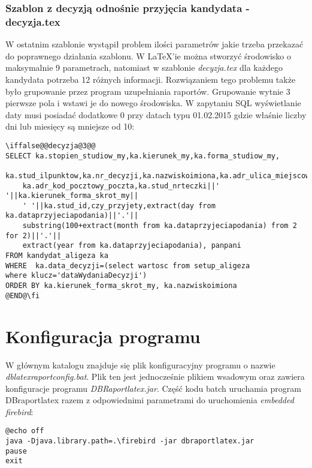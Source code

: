 \subsubsection*{Szablon z decyzją odnośnie przyjęcia kandydata - decyzja.tex}
W ostatnim szablonie wystąpił problem ilości parametrów jakie trzeba przekazać do poprawnego działania szablonu. W LaTeX'ie można stworzyć środowisko o maksymalnie 9 parametrach, natomiast w szablonie \emph{decyzja.tex} dla każdego kandydata potrzeba 12 różnych informacji. Rozwiązaniem tego problemu także było grupowanie przez program uzupełniania raportów. Grupowanie wytnie 3 pierwsze pola i wstawi je do nowego środowiska. W zapytaniu SQL wyświetlanie daty musi posiadać dodatkowe 0 przy datach typu 01.02.2015 gdzie właśnie liczby dni lub miesięcy są mniejsze od 10:
 \begin{lstlisting}
\iffalse@@decyzja@3@@
SELECT ka.stopien_studiow_my,ka.kierunek_my,ka.forma_studiow_my,
	ka.stud_ilpunktow,ka.nr_decyzji,ka.nazwiskoimiona,ka.adr_ulica_miejscowosc_nr_domu,
	ka.adr_kod_pocztowy_poczta,ka.stud_nrteczki||' '||ka.kierunek_forma_skrot_my||
	' '||ka.stud_id,czy_przyjety,extract(day from ka.dataprzyjeciapodania)||'.'||
	substring(100+extract(month from ka.dataprzyjeciapodania) from 2 for 2)||'.'||
	extract(year from ka.dataprzyjeciapodania), panpani
FROM kandydat_aligeza ka 
WHERE  ka.data_decyzji=(select wartosc from setup_aligeza 
where klucz='dataWydaniaDecyzji')
ORDER BY ka.kierunek_forma_skrot_my, ka.nazwiskoimiona
@END@\fi
\end{lstlisting}

\section{Konfiguracja programu}

W głównym katalogu znajduje się plik konfiguracyjny programu o nazwie  \emph{dblatexraportconfig.bat}. Plik ten jest jednocześnie plikiem wsadowym oraz zawiera konfiguracje programu \emph{DBRaportlatex.jar}. Część kodu batch uruchamia program DBraportlatex razem z odpowiednimi parametrami do uruchomienia \emph{embedded firebird}:
 \begin{lstlisting}
@echo off
java -Djava.library.path=.\firebird -jar dbraportlatex.jar
pause
exit
\end{lstlisting}

